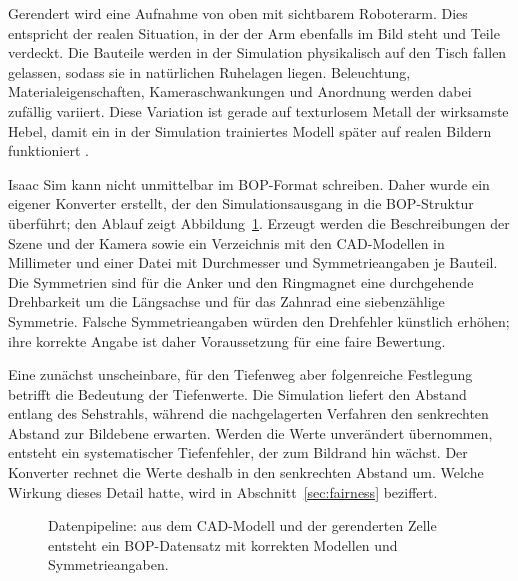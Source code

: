 \documentclass[oneside,studentpaper]{wbk}
\begin{document}
Gerendert wird eine Aufnahme von oben mit sichtbarem Roboterarm. Dies entspricht
der realen Situation, in der der Arm ebenfalls im Bild steht und Teile verdeckt.
Die Bauteile werden in der Simulation physikalisch auf den Tisch fallen gelassen,
sodass sie in natürlichen Ruhelagen liegen. Beleuchtung, Materialeigenschaften,
Kameraschwankungen und Anordnung werden dabei zufällig variiert. Diese
Variation ist gerade auf texturlosem Metall der wirksamste Hebel, damit ein in
der Simulation trainiertes Modell später auf realen Bildern funktioniert
\cite{thalhammer2024}.

Isaac Sim kann nicht unmittelbar im BOP-Format schreiben. Daher wurde ein eigener
Konverter erstellt, der den Simulationsausgang in die BOP-Struktur überführt; den
Ablauf zeigt Abbildung~\ref{fig:datapipe}. Erzeugt werden die Beschreibungen der
Szene und der Kamera sowie ein Verzeichnis mit den CAD-Modellen in Millimeter und
einer Datei mit Durchmesser und Symmetrieangaben je Bauteil. Die Symmetrien sind
für die Anker und den Ringmagnet eine durchgehende Drehbarkeit um die Längsachse
und für das Zahnrad eine siebenzählige Symmetrie. Falsche Symmetrieangaben würden
den Drehfehler künstlich erhöhen; ihre korrekte Angabe ist daher Voraussetzung
für eine faire Bewertung.

Eine zunächst unscheinbare, für den Tiefenweg aber folgenreiche Festlegung
betrifft die Bedeutung der Tiefenwerte. Die Simulation liefert den Abstand
entlang des Sehstrahls, während die nachgelagerten Verfahren den senkrechten
Abstand zur Bildebene erwarten. Werden die Werte unverändert übernommen, entsteht
ein systematischer Tiefenfehler, der zum Bildrand hin wächst. Der Konverter
rechnet die Werte deshalb in den senkrechten Abstand um. Welche Wirkung dieses
Detail hatte, wird in Abschnitt~\ref{sec:fairness} beziffert.

\begin{figure}[H]
\centering
{}
\caption{Datenpipeline: aus dem CAD-Modell und der gerenderten Zelle entsteht ein
BOP-Datensatz mit korrekten Modellen und Symmetrieangaben.}
\label{fig:datapipe}
\end{figure}
\end{document}
